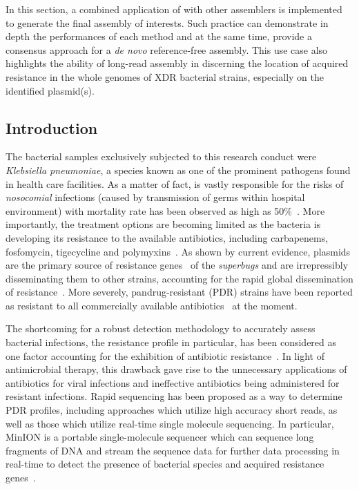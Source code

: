 In this section, a combined application of \npscarf{} with other assemblers is implemented to generate the final assembly of interests. Such practice can demonstrate in depth the performances of each method and at the same time, provide a consensus approach for a \emph{de novo} reference-free assembly.
This use case also highlights the ability of long-read assembly in discerning the location of acquired resistance in the whole genomes of XDR bacterial strains, especially on the identified plasmid(s).
\subsection{Introduction}
The bacterial samples exclusively subjected to this research conduct were \emph{Klebsiella pneumoniae}, a species known as one of the prominent pathogens found in health care facilities.
As a matter of fact, \kp{} is vastly responsible for the risks of \emph{nosocomial} infections (caused by transmission of germs within hospital environment) with mortality rate has been observed as high as 50\%~\cite{Martin2018M1,Magill2014M2,Kalanuria2014M3,Talha2009M4,Podschun1998M5}. 
More importantly, the treatment options are becoming limited as the bacteria is developing its resistance to the available antibiotics, including carbapenems, fosfomycin, tigecycline and polymyxins~\cite{Karaiskos2014M7}. As shown by current evidence, plasmids are the primary source of resistance genes~\cite{HudsonBMW2014} of the \emph{superbugs} and are irrepressibly disseminating them to other strains, accounting for the rapid global dissemination of resistance~\cite{Martin2018M1,Navon2017M6}. 
More severely, pandrug-resistant (PDR) \kp{} strains have been reported as resistant to all commercially available antibiotics~\cite{Chen2017M8,Zowawi2015} at the moment.

The shortcoming for a robust detection methodology to accurately assess bacterial infections, the resistance profile in particular, has been considered as one factor accounting for the exhibition of antibiotic resistance~\cite{sommer2017M10}.
In light of antimicrobial therapy, this drawback gave rise to the unnecessary applications of antibiotics for viral infections and ineffective antibiotics being administered for resistant infections. 
Rapid sequencing has been proposed as a way to determine PDR profiles, including approaches which utilize high accuracy short reads, as well as those which utilize real-time single molecule sequencing. 
In particular, MinION is a portable single-molecule sequencer which can sequence long fragments of DNA and stream the sequence data for further data processing in real-time to detect the presence of bacterial species and acquired resistance genes~\cite{Gardy2018M11, Lemon2017M15,Votintseva2017M16,CaoGE2016,QuickAC2015}. 

